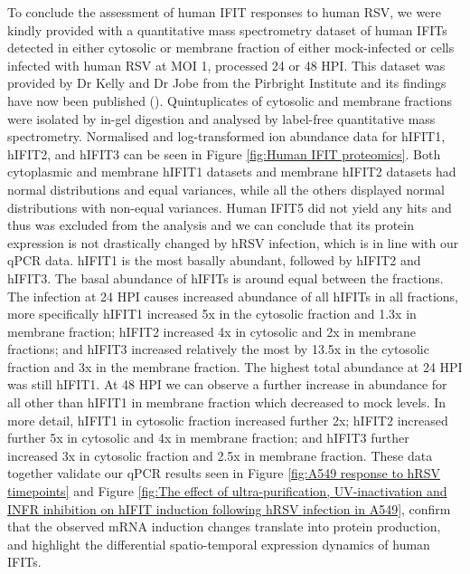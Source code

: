 To conclude the assessment of human IFIT responses to human RSV, we were kindly provided with a quantitative mass spectrometry dataset of human IFITs detected in either cytosolic or membrane fraction of either mock-infected or cells infected with human RSV at MOI 1, processed 24 or 48 HPI. This dataset was provided by Dr Kelly and Dr Jobe from the Pirbright Institute and its findings have now been published (\cite{Jobe2023ViralCondensates}). Quintuplicates of cytosolic and membrane fractions were isolated by in-gel digestion and analysed by label-free quantitative mass spectrometry. Normalised and log-transformed ion abundance data for hIFIT1, hIFIT2, and hIFIT3 can be seen in Figure \ref{fig:Human IFIT proteomics}. Both cytoplasmic and membrane hIFIT1 datasets and membrane hIFIT2 datasets had normal distributions and equal variances, while all the others displayed normal distributions with non-equal variances. Human IFIT5 did not yield any hits and thus was excluded from the analysis and we can conclude that its protein expression is not drastically changed by hRSV infection, which is in line with our qPCR data. hIFIT1 is the most basally abundant, followed by hIFIT2 and hIFIT3. The basal abundance of hIFITs is around equal between the fractions. The infection at 24 HPI causes increased abundance of all hIFITs in all fractions, more specifically hIFIT1 increased 5x in the cytosolic fraction and 1.3x in membrane fraction; hIFIT2 increased 4x in cytosolic and 2x in membrane fractions; and hIFIT3 increased relatively the most by 13.5x in the cytosolic fraction and 3x in the membrane fraction. The highest total abundance at 24 HPI was still hIFIT1. At 48 HPI we can observe a further increase in abundance for all other than hIFIT1 in membrane fraction which decreased to mock levels. In more detail, hIFIT1 in cytosolic fraction increased further 2x; hIFIT2 increased further 5x in cytosolic and 4x in membrane fraction; and hIFIT3 further increased 3x in cytosolic fraction and 2.5x in membrane fraction. These data together validate our qPCR results seen in Figure \ref{fig:A549 response to hRSV timepoints} and Figure \ref{fig:The effect of ultra-purification, UV-inactivation and INFR inhibition on hIFIT induction following hRSV infection in A549}, confirm that the observed mRNA induction changes translate into protein production, and highlight the differential spatio-temporal expression dynamics of human IFITs.

